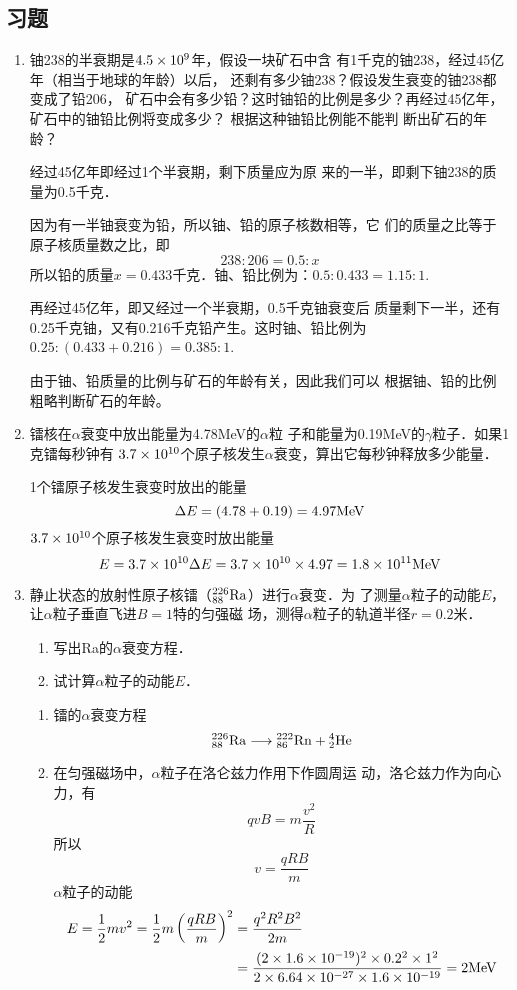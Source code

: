 \subsection{习题}
\begin{enumerate}
    \item 铀238的半衰期是$4.5\x 10^9$年，假设一块矿石中含
有1千克的铀238，经过45亿年（相当于地球的年龄）以后，
还剩有多少铀238？假设发生衰变的铀238都变成了铅206，
矿石中会有多少铅？这时铀铅的比例是多少？再经过45亿年，
矿石中的铀铅比例将变成多少？ 根据这种铀铅比例能不能判
断出矿石的年龄？


\begin{solution}
经过45亿年即经过1个半衰期，剩下质量应为原
来的一半，即剩下铀238的质量为0.5千克．

因为有一半铀衰变为铅，所以铀、铅的原子核数相等，它
们的质量之比等于原子核质量数之比，即
\[238:206=0.5:x\]
所以铅的质量$x=0.433$千克．铀、铅比例为：$0.5:0.433
=1.15:1$.

再经过45亿年，即又经过一个半衰期，0.5千克铀衰变后
质量剩下一半，还有0.25千克铀，又有0.216千克铅产生。这时铀、铅比例为$0.25:(0.433+0.216)=0.385:1$.

由于铀、铅质量的比例与矿石的年龄有关，因此我们可以
根据铀、铅的比例粗略判断矿石的年龄。
\end{solution}
\item 镭核在$\alpha$衰变中放出能量为4.78MeV的$\alpha$粒
子和能量为0.19MeV的$\gamma$粒子．如果1克镭每秒钟有
$3.7\x10^{10}$个原子核发生$\alpha$衰变，算出它每秒钟释放多少能量．

\begin{solution}
1个镭原子核发生衰变时放出的能量
\[\Delta E=(4.78+0.19)=4.97{\rm MeV}\]
$3.7\x10^{10}$个原子核发生衰变时放出能量
\[E=3.7\x10^{10}\Delta E=3.7\x10^{10}\x4.97=1.8\x10^{11}{\rm MeV}\]
\end{solution}
\item 静止状态的放射性原子核镭（$\atom{Ra}{226}{88}$）进行$\alpha$衰变．为
了测量$\alpha$粒子的动能$E$，让$\alpha$粒子垂直飞进$B=1$特的匀强磁
场，测得$\alpha$粒子的轨道半径$r=0.2$米．
\begin{enumerate}
    \item 写出Ra的$\alpha$衰变方程．
    \item 试计算$\alpha$粒子的动能$E$．
\end{enumerate}

\begin{solution}
\begin{enumerate}
    \item 镭的$\alpha$衰变方程
\[\atom{Ra}{226}{88}\longrightarrow \atom{Rn}{222}{86}+\atom{He}{4}{2}\]
    \item 在匀强磁场中，$\alpha$粒子在洛仑兹力作用下作圆周运
    动，洛仑兹力作为向心力，有
    \[qvB=m\frac{v^2}{R}\]
    所以 \[v=\frac{qRB}{m}\]
    $\alpha$粒子的动能
\[\begin{split}
    E=\frac{1}{2}mv^2=\frac{1}{2}m\left(\frac{qRB}{m}\right)^2    &=\frac{q^2R^2B^2}{2m}\\
&=\frac{(2\x 1.6\x 10^{-19})^2\x 0.2^2\x 1^2}{2\x 6.64\x 10^{-27}\x 1.6\x 10^{-19}}=2{\rm MeV}
\end{split}\]
\end{enumerate}



\end{solution}
\end{enumerate}
